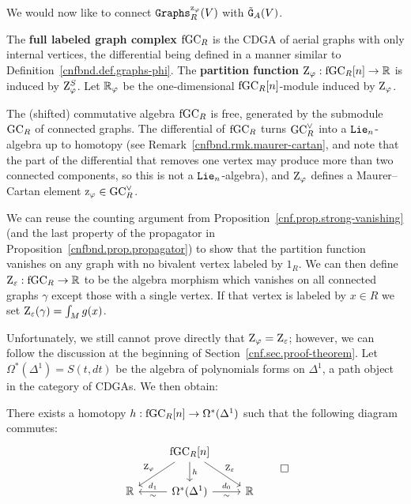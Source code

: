 We would now like to connect $\mathtt{Graphs}^{\mathrm{z}_{\varphi}}_{R}(V)$ with $\tilde{\mathtt{G}}_{A}(V)$.

\begin{definition}
  The \textbf{full labeled graph complex} $\mathrm{fGC}_{R}$ is the CDGA of aerial graphs with only internal vertices, the differential being defined in a manner similar to Definition~\ref{cnfbnd.def.graphs-phi}.
  The \textbf{partition function} $\mathrm{Z}_{\varphi} : \mathrm{fGC}_{R}[n] \to \mathbb{R}$ is induced by $\mathrm{Z}_{\varphi}^{S}$.
  Let $\mathbb{R}_{\varphi}$ be the one-dimensional $\mathrm{fGC}_{R}[n]$-module induced by $\mathrm{Z}_{\varphi}$.
\end{definition}

The (shifted) commutative algebra $\mathrm{fGC}_{R}$ is free, generated by the submodule $\mathrm{GC}_{R}$ of connected graphs.
The differential of $\mathrm{fGC}_{R}$ turns $\mathrm{GC}_{R}^{\vee}$ into a $\mathtt{Lie}_{n}$-algebra up to homotopy (see Remark~\ref{cnfbnd.rmk.maurer-cartan}, and note that the part of the differential that removes one vertex may produce more than two connected components, so this is not a $\mathtt{Lie}_{n}$-algebra), and $\mathrm{Z}_{\varphi}$ defines a Maurer--Cartan element $\mathrm{z}_{\varphi} \in \mathrm{GC}_{R}^{\vee}$.

We can reuse the counting argument from Proposition~\ref{cnf.prop.strong-vanishing} (and the last property of the propagator in Proposition~\ref{cnfbnd.prop.propagator}) to show that the partition function vanishes on any graph with no bivalent vertex labeled by $1_{R}$.
We can then define $\mathrm{Z}_{\varepsilon} : \mathrm{fGC}_{R} \to \mathbb{R}$ to be the algebra morphism which vanishes on all connected graphs $\gamma$ except those with a single vertex.
If that vertex is labeled by $x \in R$ we set $\mathrm{Z}_{\varepsilon}(\gamma) = \int_{M} g(x)$.

Unfortunately, we still cannot prove directly that $\mathrm{Z}_{\varphi} = \mathrm{Z}_{\varepsilon}$; however, we can follow the discussion at the beginning of Section~\ref{cnf.sec.proof-theorem}.
Let $\Omega^{*}(\Delta^{1}) = S(t,dt)$ be the algebra of polynomials forms on $\Delta^{1}$, a path object in the category of CDGAs.
We then obtain:

\begin{proposition}
  There exists a homotopy $h : \mathrm{fGC}_{R}[n] \to \Omega^{*}(\Delta^{1})$ such that the following diagram commutes:
  \[ \begin{tikzcd}
      {} & \fGC_{R}[n] \dlar[swap]{\Zphi} \drar{\Ze} \dar{h} \\
      \R & \Omega^{*}(\Delta^{1}) \lar{\sim}[swap]{d_{1}} \rar{d_{0}}[swap]{\sim} & \R
    \end{tikzcd}
  \qed \]
\end{proposition}

